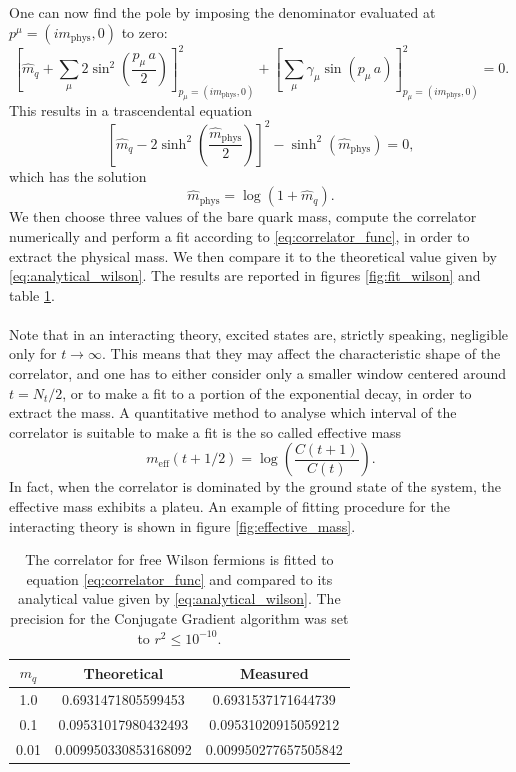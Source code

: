 One can now find the pole by imposing the denominator evaluated at $p^\mu =(im_\text{phys}, 0)$ to zero:
\begin{equation*}
    \left[\hat{m}_q + \sum_\mu 2 \sin ^2\left(\frac{p_\mu \, a}{2}\right)\right]^2_{p_\mu = (im_\text{phys}, 0)} + \left[\sum_\mu \gamma_\mu \sin \left(p_\mu \, a\right)\right]^2_{p_\mu = (im_\text{phys}, 0)} = 0.
\end{equation*}
This results in a trascendental equation 
\begin{equation*}
    \left[\hat{m}_q - 2 \sinh^2\left(\frac{\hat{m}_\text{phys}}{2}\right)\right]^2 - \sinh^2\left(\hat{m}_\text{phys}\right) = 0,
\end{equation*}
which has the solution 
\begin{equation}
    \hat{m}_\text{phys} = \log\left(1+\hat{m}_q\right).
    \label{eq:analytical_wilson}
\end{equation}
We then choose three values of the bare quark mass, compute the correlator numerically and perform a fit according to \eqref{eq:correlator_func}, in order to extract the physical mass. We then compare it to the theoretical value given by \eqref{eq:analytical_wilson}. The results are reported in figures \ref{fig:fit_wilson} and table \ref{tab:free_wilson_fit}. \\~\\
Note that in an interacting theory, excited states are, strictly speaking, negligible only for $t \to \infty$. This means that they may affect the characteristic shape of the correlator, and one has to either consider only a smaller window centered around $t=N_t/2$, or to make a fit to a portion of the exponential decay, in order to extract the mass. A quantitative method 
to analyse which interval of the correlator is suitable to make a fit is the so called effective mass \cite{gattringer_LQCD}
\begin{equation}
    m_\text{eff}(t + 1/2) = \log\left(\frac{C(t+1)}{C(t)}\right).
    \label{eq:effective_mass}
\end{equation}
In fact, when the correlator is dominated by the ground state of the system, the effective mass exhibits a plateu. An example of fitting procedure for the interacting theory is shown in figure \ref{fig:effective_mass}.
\newpage
\vfill
\begin{table}[h!]
    \centering
    \begin{tabular}[pos]{ccc}
        \toprule
        $m_q$ & Theoretical & Measured \\
        \midrule 
        1.0 & 0.6931471805599453 & 0.6931537171644739 \\
        0.1 & 0.09531017980432493 & 0.09531020915059212 \\
        0.01 & 0.009950330853168092 & 0.009950277657505842 \\
        \bottomrule
    \end{tabular}
    \caption[Fit of the correlator for free Wilson fermions.]{The correlator for free Wilson fermions is fitted to equation \eqref{eq:correlator_func} and compared to its analytical value given by \eqref{eq:analytical_wilson}. The precision for the Conjugate Gradient algorithm was set to $r^2 \leq 10^{-10}$.}
    \label{tab:free_wilson_fit}
\end{table}
